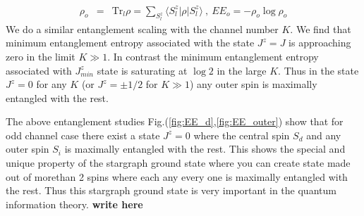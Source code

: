 \documentclass[reprint,prb,superscriptaddress]{revtex4-1}
\begin{document}
\begin{eqnarray}
\rho_{o} &=& \textrm{Tr}_{l} \rho =\displaystyle\sum_{S^z_{l}} \langle S^z_l | \rho | S^z_{l} \rangle~,~EE_o=-\rho_{o}\log \rho_{o}
\end{eqnarray}
We do a similar entanglement scaling with the channel number $K$. We find that minimum entanglement entropy associated with the state $J^z=J$ is approaching zero in the limit $K\gg 1$. In contrast the minimum entanglement entropy associated with $J^z_{min}$ state is saturating at $\log 2$ in the large $K$. Thus in the state $J^z=0$ for any $K$ (or $J^z=\pm 1/2$ for $K\gg 1$) any outer spin is maximally entangled with the rest.

\par The above entanglement studies Fig.(\ref{fig:EE_d},\ref{fig:EE_outer}) show  that for odd channel case there exist a state $J^z=0$ where the central spin $S_d$ and any outer spin $S_i$ is maximally entangled with the rest. This shows the special and unique property of the stargraph ground state where you can create state made out of morethan 2 spins where each any every one is maximally entangled with the rest. Thus this stargraph ground state is very important in the quantum information theory. 
\textbf{write here}
\end{document}
